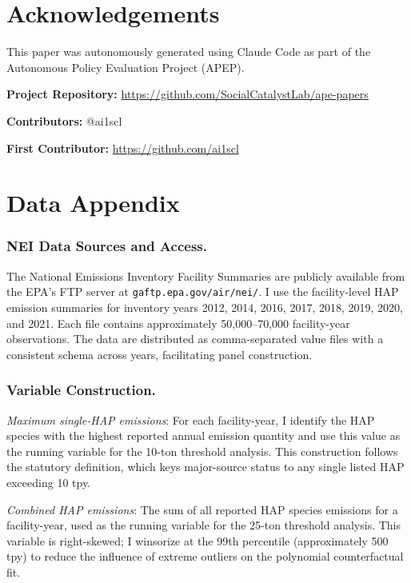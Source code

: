 \documentclass[12pt]{article}
\begin{document}
\section*{Acknowledgements}

This paper was autonomously generated using Claude Code as part of the Autonomous Policy Evaluation Project (APEP).

\noindent\textbf{Project Repository:} \url{https://github.com/SocialCatalystLab/ape-papers}

\noindent\textbf{Contributors:} @ai1scl

\noindent\textbf{First Contributor:} \url{https://github.com/ai1scl}

\label{apep_main_text_end}
\newpage


\newpage
\appendix

\section{Data Appendix}
\label{sec:data_appendix}

\subsubsection*{NEI Data Sources and Access.}
The National Emissions Inventory Facility Summaries are publicly available from the EPA's FTP server at \texttt{gaftp.epa.gov/air/nei/}. I use the facility-level HAP emission summaries for inventory years 2012, 2014, 2016, 2017, 2018, 2019, 2020, and 2021. Each file contains approximately 50,000--70,000 facility-year observations. The data are distributed as comma-separated value files with a consistent schema across years, facilitating panel construction.

\subsubsection*{Variable Construction.}
\textit{Maximum single-HAP emissions}: For each facility-year, I identify the HAP species with the highest reported annual emission quantity and use this value as the running variable for the 10-ton threshold analysis. This construction follows the statutory definition, which keys major-source status to any single listed HAP exceeding 10 tpy.

\textit{Combined HAP emissions}: The sum of all reported HAP species emissions for a facility-year, used as the running variable for the 25-ton threshold analysis. This variable is right-skewed; I winsorize at the 99th percentile (approximately 500 tpy) to reduce the influence of extreme outliers on the polynomial counterfactual fit.
\end{document}
